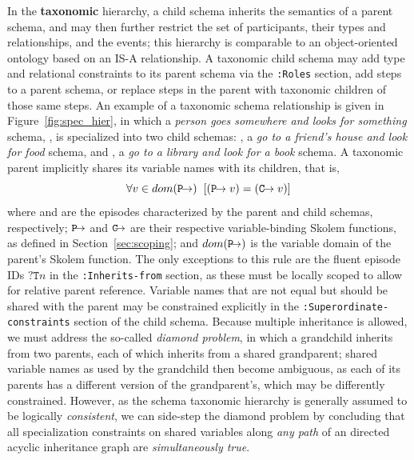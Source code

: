 In the \textbf{taxonomic} hierarchy, a child schema inherits the semantics of a parent schema, and may then further restrict the set of participants, their types and relationships, and the events; this hierarchy is comparable to an object-oriented ontology based on an IS-A relationship. A taxonomic child schema may add type and relational constraints to its parent schema via the \texttt{:Roles} section, add steps to a parent schema, or replace steps in the parent with taxonomic children of those same steps. An example of a taxonomic schema relationship is given in Figure~\ref{fig:spec_hier}, in which a \textit{person goes somewhere and looks for something} schema, , is specialized into two child schemas: , a \textit{go to a friend's house and look for food} schema, and , a \textit{go to a library and look for a book} schema. A taxonomic parent implicitly shares its variable names with its children, that is, $$\forall v \in dom(\texttt{P}\hspace{-1.5mm}\rightarrow) \hspace{2mm} [ (\texttt{P}\hspace{-1.5mm}\rightarrow v) = (\texttt{C}\hspace{-1.5mm}\rightarrow v)]$$ where  and  are the episodes characterized by the parent and child schemas, respectively; $\texttt{P}\hspace{-2mm}\rightarrow$ and $\texttt{C}\hspace{-2mm}\rightarrow$ are their respective variable-binding Skolem functions, as defined in Section~\ref{sec:scoping}; and $dom(\texttt{P}\hspace{-2mm}\rightarrow)$ is the variable domain of the parent's Skolem function. The only exceptions to this rule are the fluent episode IDs $\texttt{?T}n$ in the \texttt{:Inherits-from} section, as these must be locally scoped to allow for relative parent reference. Variable names that are not equal but should be shared with the parent may be constrained explicitly in the \texttt{:Superordinate-constraints} section of the child schema. Because multiple inheritance is allowed, we must address the so-called \textit{diamond problem}, in which a grandchild inherits from two parents, each of which inherits from a shared grandparent; shared variable names as used by the grandchild then become ambiguous, as each of its parents has a different version of the grandparent's, which may be differently constrained. However, as the schema taxonomic hierarchy is generally assumed to be logically \textit{consistent}, we can side-step the diamond problem by concluding that all specialization constraints on shared variables along \textit{any path} of an directed acyclic inheritance graph are \textit{simultaneously true}.

